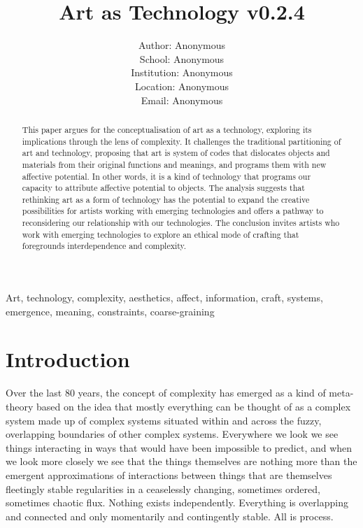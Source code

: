 \documentclass[letterpaper]{article}
\title{Art as Technology v0.2.4}
\author{Author: Anonymous\\
School: Anonymous\\
Institution: Anonymous\\
Location: Anonymous\\
Email: Anonymous\\
\newline
\newline
}
\begin{document}
 
\maketitle
\begin{abstract}

    This paper argues for the conceptualisation of art as a technology, exploring its implications through the lens of complexity. It challenges the traditional partitioning of art and technology, proposing that art is system of codes that dislocates objects and materials from their original functions and meanings, and programs them with new affective potential. In other words, it is a kind of technology that programs our capacity to attribute affective potential to objects. The analysis suggests that rethinking art as a form of technology has the potential to expand the creative possibilities for artists working with emerging technologies and offers a pathway to reconsidering our relationship with our technologies. The conclusion invites artists who work with emerging technologies to explore an ethical mode of crafting that foregrounds interdependence and complexity.

\end{abstract}


Art, technology, complexity, aesthetics, affect, information, craft, systems, emergence, meaning, constraints, coarse-graining

\section{Introduction}

    Over the last 80 years, the concept of complexity has emerged as a kind of meta-theory based on the idea that mostly everything can be thought of as a complex system made up of complex systems situated within and across the fuzzy, overlapping boundaries of other complex systems. Everywhere we look we see things interacting in ways that would have been impossible to predict, and when we look more closely we see that the things themselves are nothing more than the emergent approximations of interactions between things that are themselves fleetingly stable regularities in a ceaselessly changing, sometimes ordered, sometimes chaotic flux. Nothing exists independently. Everything is overlapping and connected and only momentarily and contingently stable. All is process.
    
\end{document}
